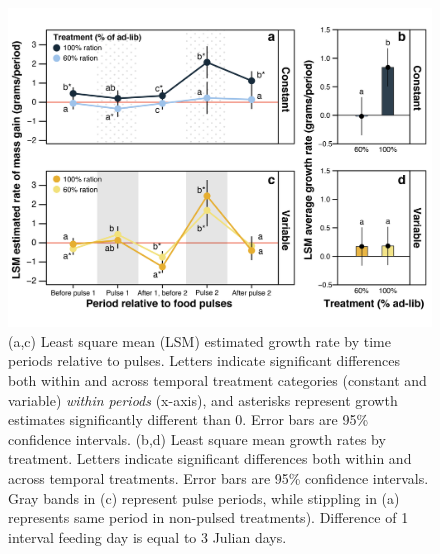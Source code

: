 \documentclass[11pt,]{article}
\begin{document}
\begin{figure}
\centering
\includegraphics{./fig3_mc_growth.png}
\caption{(a,c) Least square mean (LSM) estimated growth rate by time
periods relative to pulses. Letters indicate significant differences
both within and across temporal treatment categories (constant and
variable) \emph{within periods} (x-axis), and asterisks represent growth
estimates significantly different than 0. Error bars are 95\% confidence
intervals. (b,d) Least square mean growth rates by treatment. Letters
indicate significant differences both within and across temporal
treatments. Error bars are 95\% confidence intervals. Gray bands in (c)
represent pulse periods, while stippling in (a) represents same period
in non-pulsed treatments). Difference of 1 interval feeding day is equal
to 3 Julian days.}
\end{figure}

\clearpage

\newpage
\end{document}
